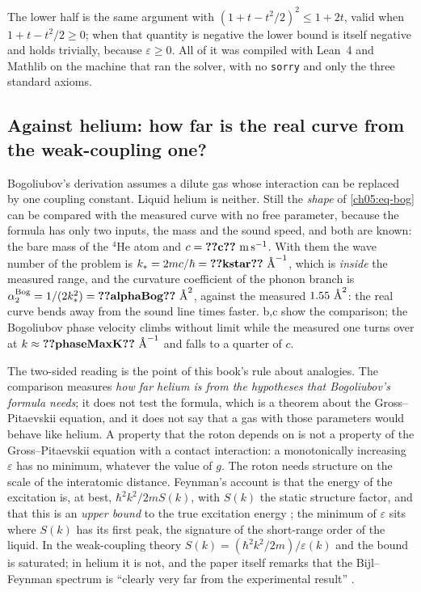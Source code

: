\noindent The lower half is the same argument with $(1+t-t^2/2)^2\le1+2t$, valid when $1+t-t^2/2\ge0$; when that quantity is negative the lower bound is itself negative and holds trivially, because $\varepsilon\ge0$.
All of it was compiled with Lean~4 and Mathlib on the machine that ran the solver, with no \texttt{sorry} and only the three standard axioms.

\subsection{Against helium: how far is the real curve from the weak-coupling one?}
Bogoliubov's derivation assumes a dilute gas whose interaction can be replaced by one coupling constant.
Liquid helium is neither.
Still the \emph{shape} of \cref{ch05:eq-bog} can be compared with the measured curve with no free parameter, because the formula has only two inputs, the mass and the sound speed, and both are known: the bare mass of the $^4$He atom and $c=\cfiveV{c}\ \mathrm{m\,s^{-1}}$.
With them the wave number of the problem is $k_\ast=2mc/\hbar=\cfiveV{kstar}\ \cfiveAng^{-1}$, which is \emph{inside} the measured range, and the curvature coefficient of the phonon branch is $\alpha_2^{\rm Bog}=1/(2k_\ast^2)=\cfiveV{alphaBog}\ \cfiveAng^2$, against the measured $1.55\ \text{\AA}^2$: the real curve bends away from the sound line  times faster.
b,c show the comparison; the Bogoliubov phase velocity climbs without limit while the measured one turns over at $k\approx\cfiveV{phaseMaxK}\ \cfiveAng^{-1}$ and falls to a quarter of $c$.

The two-sided reading is the point of this book's rule about analogies.
The comparison measures \emph{how far helium is from the hypotheses that Bogoliubov's formula needs}; it does not test the formula, which is a theorem about the Gross--Pitaevskii equation, and it does not say that a gas with those parameters would behave like helium.
A property that the roton depends on is not a property of the Gross--Pitaevskii equation with a contact interaction: a monotonically increasing $\varepsilon$ has no minimum, whatever the value of $g$.
The roton needs structure on the scale of the interatomic distance.
Feynman's account is that the energy of the excitation is, at best, $\hbar^2k^2/2mS(k)$, with $S(k)$ the static structure factor, and that this is an \emph{upper bound} to the true excitation energy \cite{Feynman1954,FeynmanCohen1956}; the minimum of $\varepsilon$ sits where $S(k)$ has its first peak, the signature of the short-range order of the liquid.
In the weak-coupling theory $S(k)=(\hbar^2k^2/2m)/\varepsilon(k)$ and the bound is saturated; in helium it is not, and the paper itself remarks that the Bijl--Feynman spectrum is ``clearly very far from the experimental result'' \cite{Godfrin2021}.

